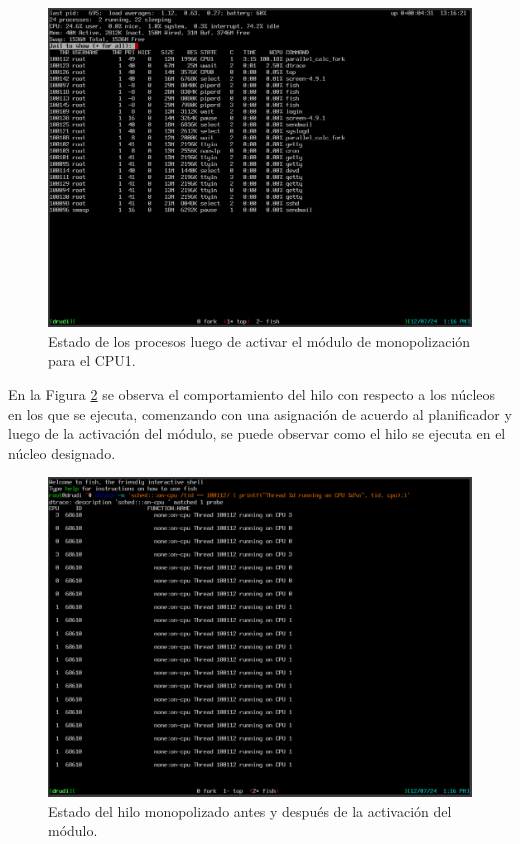\begin{figure}[H]
    \centering
    \includegraphics[width=1\textwidth]{images/cpuMonopolized-on.png}
    \caption{Estado de los procesos luego de activar el módulo de monopolización para el CPU1.}
    \label{fig:cpuMonopolized-on}
\end{figure}

En la Figura \ref{fig:cpuMonopolized-dtrace} se observa el comportamiento del hilo con respecto a los núcleos en los que se ejecuta, comenzando con una asignación de acuerdo al planificador y luego de la activación del módulo, se puede observar como el hilo se ejecuta en el núcleo designado.\par

\begin{figure}[H]
    \centering
    \includegraphics[width=1\textwidth]{images/cpuMonopolized-dtrace.png}
    \caption{Estado del hilo monopolizado antes y después de la activación del módulo.}
    \label{fig:cpuMonopolized-dtrace}
\end{figure}

